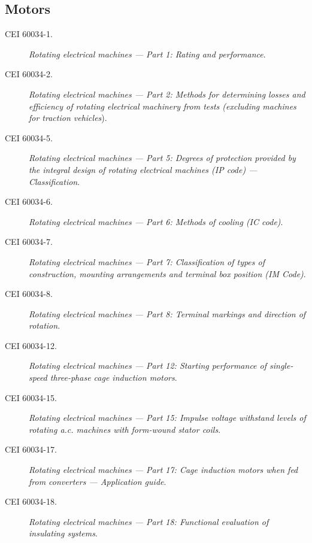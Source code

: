 \subsection*{Motors}
\begin{description}
    \item [\hspace{5mm}CEI 60034-1.] \textit{Rotating electrical machines --- Part 1: Rating and performance}.
    \item [\hspace{5mm}CEI 60034-2.] \textit{Rotating electrical machines --- Part 2: Methods for determining losses and
efficiency of rotating electrical machinery from tests (excluding machines for traction vehicles}).
    \item [\hspace{5mm}CEI 60034-5.] \textit{Rotating electrical machines --- Part 5: Degrees of protection provided by the
integral design of rotating electrical machines (IP code) ---  Classification}.
    \item [\hspace{5mm}CEI 60034-6.] \textit{Rotating electrical machines --- Part 6: Methods of cooling (IC code)}.
    \item [\hspace{5mm}CEI 60034-7.] \textit{Rotating electrical machines --- Part 7: Classification of types of construction, mounting arrangements and terminal box position (IM Code)}.
    \item [\hspace{5mm}CEI 60034-8.] \textit{Rotating electrical machines --- Part 8: Terminal markings and direction of
rotation}.
    \item [\hspace{5mm}CEI 60034-12.] \textit{Rotating electrical machines --- Part 12: Starting performance of single-speed
three-phase cage induction motors}.
    \item [\hspace{5mm}CEI 60034-15.] \textit{Rotating electrical machines --- Part 15: Impulse voltage withstand levels of
rotating a.c. machines with form-wound stator coils}.
    \item [\hspace{5mm}CEI 60034-17.] \textit{Rotating electrical machines --- Part 17: Cage induction motors when fed from
converters --- Application guide}.
    \item [\hspace{5mm}CEI 60034-18.] \textit{Rotating electrical machines --- Part 18: Functional evaluation of insulating
systems}.
\end{description}

